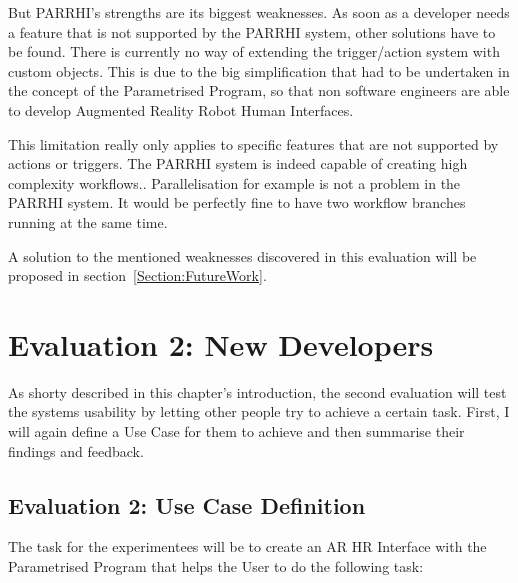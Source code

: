 But PARRHI's strengths are its biggest weaknesses. As soon as a developer needs a feature that is not supported by the PARRHI system, other solutions have to be found. There is currently no way of extending the trigger/action system with custom objects. This is due to the big simplification that had to be undertaken in the concept of the Parametrised Program, so that non software engineers are able to develop Augmented Reality Robot Human Interfaces. 

This limitation really only applies to specific features that are not supported by actions or triggers. The PARRHI system is indeed capable of creating high complexity workflows.. Parallelisation for example is not a problem in the PARRHI system. It would be perfectly fine to have two workflow branches running at the same time. 

A solution to the mentioned weaknesses discovered in this evaluation will be proposed in section~\ref{Section:FutureWork}.

\section{Evaluation 2: New Developers}
As shorty described in this chapter's introduction, the second evaluation will test the systems usability by letting other people try to achieve a certain task. First, I will again define a Use Case for them to achieve and then summarise their findings and feedback.

\subsection{Evaluation 2: Use Case Definition}
The task for the experimentees will be to create an AR HR Interface with the Parametrised Program that helps the User to do the following task:

\FloatBarrier

